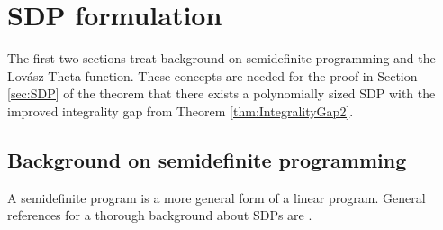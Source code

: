 \chapter{SDP formulation}\label{chap:SDP}

The first two sections treat background on semidefinite programming and the Lov\'{a}sz Theta function. These concepts are needed for the proof in Section \ref{sec:SDP} of the theorem that there exists a polynomially sized SDP with the improved integrality gap from Theorem \ref{thm:IntegralityGap2}. %

\section{Background on semidefinite programming}\label{sec:Background}

A semidefinite program is a more general form of a linear program. %
General references for a thorough background about SDPs are \cite{SDP11,SDP2,SDP10,SDP5,SDP1}.

